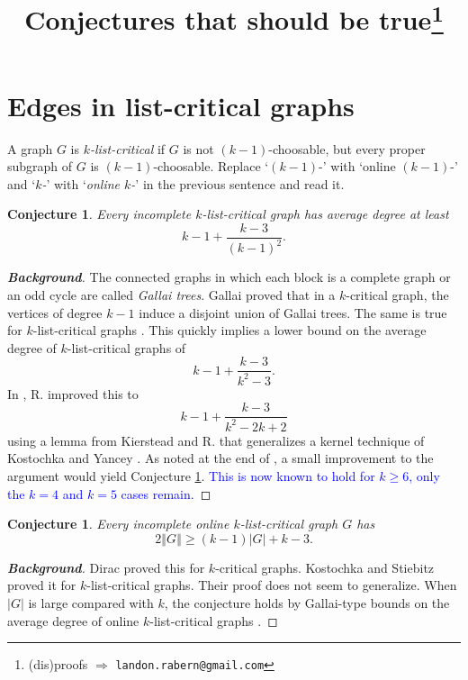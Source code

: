 \documentclass[12pt]{article}
\title{Conjectures that should be true\thanks{(dis)proofs $\Rightarrow$ \texttt{landon.rabern@gmail.com}}}
\theoremstyle{plain}
\newtheorem{conjecture}[thm]{Conjecture}
\theoremstyle{definition}
\theoremstyle{remark}
\newcommand{\card}[1]{\left|#1\right|}
\newcommand{\size}[1]{\left\Vert#1\right\Vert}
\begin{document}
\maketitle


\section{Edges in list-critical graphs}
A graph $G$ is \emph{$k$-list-critical} if $G$ is not $(k-1)$-choosable, but every
proper subgraph of $G$ is $(k-1)$-choosable.  Replace `$(k-1)$-' with `online $(k-1)$-' and `\emph{$k$-}' with `\emph{online $k$-}' in the previous sentence and read it.

\begin{conjecture}\label{C1}
Every incomplete $k$-list-critical graph has average degree at least \[k-1 + \frac{k-3}{(k-1)^2}.\]
\end{conjecture}
\begin{proof}[\textbf{Background}]
The connected graphs in which each block is a complete graph or an odd cycle are called \emph{Gallai trees}.  Gallai \cite{gallai1963kritische} proved that in a $k$-critical graph, 
the vertices of degree $k-1$ induce a disjoint union of Gallai trees.  The same is true for $k$-list-critical graphs \cite{borodin1977criterion, erdos1979choosability}. 
This quickly implies a lower bound on the average degree of $k$-list-critical graphs of \[k-1 + \frac{k-3}{k^2-3}.\]
In \cite{rabern2016better}, R. improved this to \[k-1 + \frac{k-3}{k^2-2k+2}\] using a lemma from Kierstead and R. \cite{KernelMagic} that generalizes a kernel technique of Kostochka and Yancey \cite{kostochkayancey2012ore}.
As noted at the end of \cite{rabern2016better}, a small improvement to the argument would yield Conjecture \ref{C1}.   \textcolor{blue}{This is now known to hold for $k\ge6$, only the $k=4$ and $k=5$ cases remain.}
\end{proof}

\begin{conjecture}
Every incomplete online $k$-list-critical graph $G$ has \[2\size{G} \ge (k-1)\card{G} + k-3.\]
\end{conjecture}\label{C2}
\begin{proof}[\textbf{Background}]
Dirac \cite{dirac1957theorem} proved this for $k$-critical graphs.  Kostochka and Stiebitz \cite{kostochka2002list} proved it for $k$-list-critical graphs.  Their proof does not seem to generalize.
When $\card{G}$ is large compared with $k$, the conjecture holds by Gallai-type bounds on the average degree of online $k$-list-critical graphs \cite{OreVizing,DischargingLowerBound}.
\end{proof}
\end{document}

